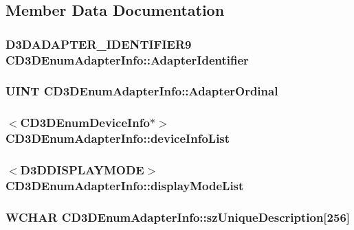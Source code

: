 \subsection{Member Data Documentation}
\hypertarget{class_c_d3_d_enum_adapter_info_a1d603b4cc9e0a298090a1fecfa1084a2}{
\subsubsection[{AdapterIdentifier}]{\setlength{\rightskip}{0pt plus 5cm}D3DADAPTER\_\-IDENTIFIER9 {\bf CD3DEnumAdapterInfo::AdapterIdentifier}}}
\label{class_c_d3_d_enum_adapter_info_a1d603b4cc9e0a298090a1fecfa1084a2}
\hypertarget{class_c_d3_d_enum_adapter_info_abf8c095138a96f052a283cf641d093d0}{
\subsubsection[{AdapterOrdinal}]{\setlength{\rightskip}{0pt plus 5cm}UINT {\bf CD3DEnumAdapterInfo::AdapterOrdinal}}}
\label{class_c_d3_d_enum_adapter_info_abf8c095138a96f052a283cf641d093d0}
\hypertarget{class_c_d3_d_enum_adapter_info_adb1f596b3deed9388644ea7480d1c2ad}{
\subsubsection[{deviceInfoList}]{$<${\bf CD3DEnumDeviceInfo}$\ast$$>$ {\bf CD3DEnumAdapterInfo::deviceInfoList}}}
\label{class_c_d3_d_enum_adapter_info_adb1f596b3deed9388644ea7480d1c2ad}
\hypertarget{class_c_d3_d_enum_adapter_info_ac5d98f229e64a218e04a6d69cf81c925}{
\subsubsection[{displayModeList}]{$<$D3DDISPLAYMODE$>$ {\bf CD3DEnumAdapterInfo::displayModeList}}}
\label{class_c_d3_d_enum_adapter_info_ac5d98f229e64a218e04a6d69cf81c925}
\hypertarget{class_c_d3_d_enum_adapter_info_acd2d97d434ad9fcd3401b17eaccb90d5}{
\subsubsection[{szUniqueDescription}]{\setlength{\rightskip}{0pt plus 5cm}WCHAR {\bf CD3DEnumAdapterInfo::szUniqueDescription}\mbox{[}256\mbox{]}}}
\label{class_c_d3_d_enum_adapter_info_acd2d97d434ad9fcd3401b17eaccb90d5}


